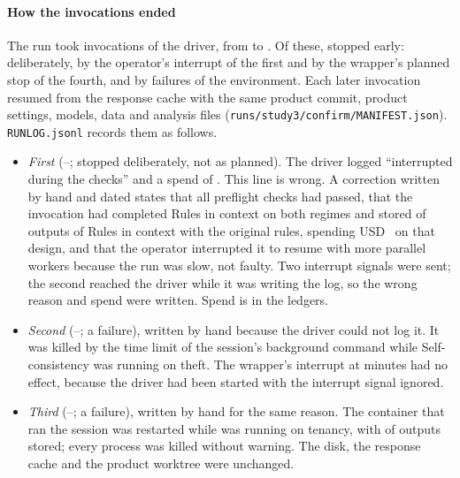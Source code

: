 \paragraph{How the invocations ended}
The run took \sthreeRunInvocations{} invocations of the driver, from \sthreeRunFirstDate{} \sthreeRunFirstStart{} to \sthreeRunLastDate{} \sthreeRunLastEnd. Of these, \sthreeRunNotComplete{} stopped early: \sthreeRunDeliberateStops{} deliberately, by the operator's interrupt of the first and by the wrapper's planned stop of the fourth, and \sthreeRunFailureStops{} by failures of the environment. Each later invocation resumed from the response cache with the same product commit, product settings, models, data and analysis files (\texttt{runs/\allowbreak{}study3/\allowbreak{}confirm/\allowbreak{}MANIFEST.json}). \texttt{RUNLOG.jsonl} records them as follows.
\begin{itemize}[leftmargin=1.2em,itemsep=1pt]
\item \emph{First} (\sthreeRunStartOne--\sthreeRunEndOne; stopped deliberately, not as planned). The driver logged ``interrupted during the checks'' and a spend of \sthreeRunFirstLoggedSpend. This line is wrong. A correction written by hand and dated \sthreeRunCorrectionDate{} \sthreeRunCorrectionTime{} states that all \sthreeRunChecks{} preflight checks had passed, that the invocation had completed Rules in context on both regimes and stored \sthreeRunFirstStoredOrig{} of \sthreeRunFirstExpectedOrig{} outputs of Rules in context with the original rules, spending USD~\sthreeRunFirstSpentOrig{} on that design, and that the operator interrupted it to resume with more parallel workers because the run was slow, not faulty. Two interrupt signals were sent; the second reached the driver while it was writing the log, so the wrong reason and spend were written. Spend is in the ledgers.
\item \emph{Second} (\sthreeRunStartTwo--\sthreeRunEndTwo; a failure), written by hand because the driver could not log it. It was killed by the time limit of the session's background command while Self-consistency was running on theft. The wrapper's interrupt at \sthreeRunWrapperMinutes{} minutes had no effect, because the driver had been started with the interrupt signal ignored.
\item \emph{Third} (\sthreeRunStartThree--\sthreeRunEndThree; a failure), written by hand for the same reason. The container that ran the session was restarted while \casepath was running on tenancy, with \sthreeRunThirdStoredTenancy{} of \sthreeRunThirdExpectedTenancy{} outputs stored; every process was killed without warning. The disk, the response cache and the product worktree were unchanged.

\end{itemize}

